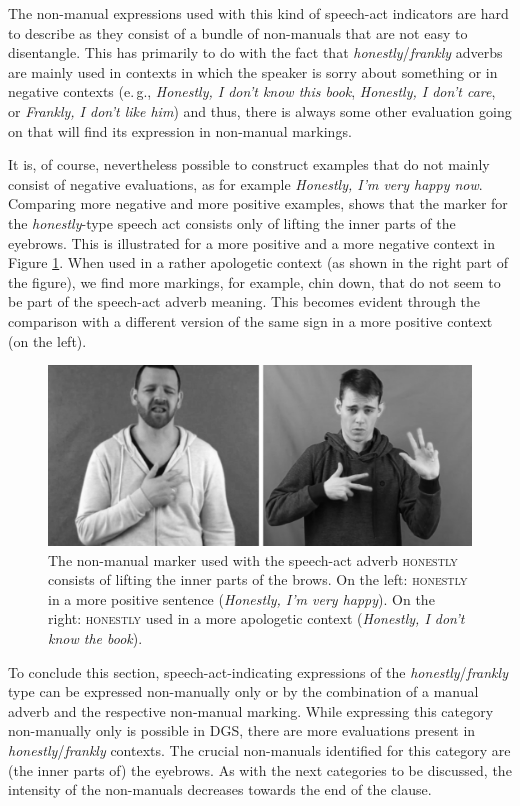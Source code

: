 The non-manual expressions used with this kind of speech-act indicators are hard to describe as they consist of a bundle of non-manuals that are not easy to disentangle. This has primarily to do with the fact that \textit{honestly}/\textit{frankly} adverbs are mainly used in contexts in which the speaker is sorry about something or in negative contexts (e.\,g., \textit{Honestly, I don't know this book}, \textit{Honestly, I don't care}, or \textit{Frankly, I don't like him}) and thus, there is always some other evaluation going on that will find its expression in non-manual markings.

It is, of course, nevertheless possible to construct examples that do not mainly consist of negative evaluations, as for example \textit{Honestly, I'm very happy now}. Comparing more negative and more positive examples, shows that the marker for the \textit{honestly}-type speech act consists only of lifting the inner parts of the eyebrows. This is illustrated for a more positive and a more negative context in Figure \ref{fig:honestly}. When used in a rather apologetic context (as shown in the right part of the figure), we find more markings, for example, chin down, that do not seem to be part of the speech-act adverb meaning. This becomes evident through the comparison with a different version of the same sign in a more positive context (on the left). 


\begin{figure}[bt]
\centering
	\includegraphics[width=1.0\textwidth]{honestlysw.jpg}
	\caption{The non-manual marker used with the speech-act adverb \textsc{honestly} consists of lifting the inner parts of the brows. On the left: \textsc{honestly} in a more positive sentence (\textit{Honestly, I'm very happy}). On the right: \textsc{honestly} used in a more apologetic context (\textit{Honestly, I don't know the book}).}
	\label{fig:honestly}
\end{figure}

To conclude this section, speech-act-indicating expressions of the \textit{honestly}/\textit{frankly} type can be expressed non-manually only or by the combination of a manual adverb and the respective non-manual marking. While expressing this category non-manually only is possible in DGS, there are more evaluations present in \textit{honestly}/\textit{frankly} contexts. The crucial non-manuals identified for this category are (the inner parts of) the eyebrows. As with the next categories to be discussed, the intensity of the non-manuals decreases towards the end of the clause.


